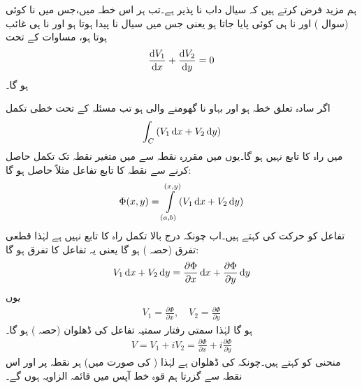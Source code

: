 ہم مزید فرض کرتے ہیں کہ سیال داب نا پذیر ہے۔تب ہر اس خطہ میں،جس میں نا کوئی  (سوال ) اور نا ہی کوئی  پایا جاتا ہو یعنی جس میں سیال نا پیدا ہوتا ہو اور نا ہی غائب ہوتا ہو، مساوات  کے تحت
\begin{align}\label{مساوات_مخفی_قوہ_داب_نا_پذیر_الف}
\frac{\dif V_1}{\dif x}+\frac{\dif V_2}{\dif y}=0
\end{align}
ہو گا۔

اگر  سادہ تعلق خطہ ہو اور بہاو نا گھومنے والی ہو تب مسئلہ  کے تحت خطی تکمل
\begin{align}
\int_C\, (V_1\dif x+V_2\dif y)
\end{align}
 میں راہ کا تابع نہیں ہو گا۔یوں  میں مقررہ نقطہ  سے  میں متغیر نقطہ  تک تکمل حاصل کرنے سے  نقطہ  کا تابع تفاعل مثلاً  حاصل ہو گا:
\begin{align}
\Phi(x,y)=\int\limits_{(a,b)}^{(x,y)} (V_1\dif x+V_2\dif y)
\end{align}
تفاعل  کو حرکت کی  کہتے ہیں۔اب چونکہ درج بالا تکمل راہ کا تابع نہیں  ہے لہٰذا  قطعی تفرق (حصہ ) ہو گا یعنی یہ تفاعل  کا تفرق ہو گا:
\begin{align}
V_1\dif x+V_2\dif y=\frac{\partial \Phi}{\partial x}\dif x+\frac{\partial \Phi}{\partial y}\dif y
\end{align}
یوں 
\begin{align}\label{مساوات_مخفی_قوہ_ڈھلوان_مخفی_الف}
V_1=\frac{\partial \Phi}{\partial x},\quad V_2=\frac{\partial \Phi}{\partial y}
\end{align}
ہو گا لہٰذا سمتی رفتار سمتیہ تفاعل  کی ڈھلوان (حصہ ) ہو گا۔
\begin{align}
V=V_1+iV_2=\frac{\partial \Phi}{\partial x}+i\frac{\partial \Phi}{\partial y}
\end{align}
منحنی  کو  کہتے ہیں۔چونکہ  کی ڈھلوان  ہے لہٰذا ( کی صورت میں) ہر نقطہ پر  اور اس نقطہ سے گزرتا ہم قوہ خط آپس میں قائمہ الزاویہ ہوں گے۔ 

